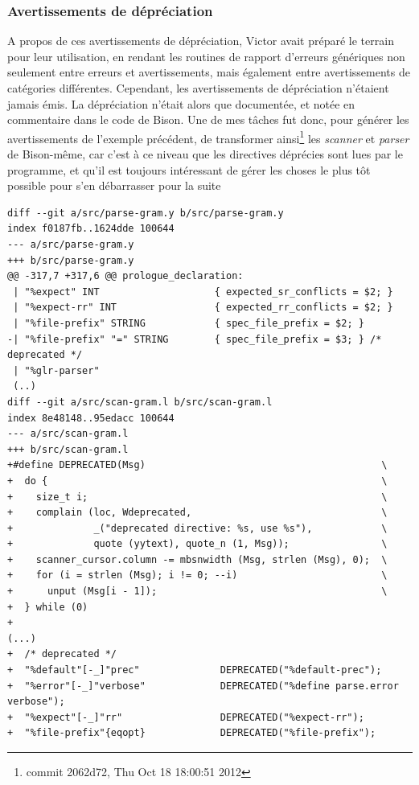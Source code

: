 \documentclass[a4paper,11pt,twoside,final]{article}
\begin{document}
  \subsubsection{Avertissements de dépréciation}

  A propos de ces avertissements de dépréciation, Victor avait préparé le
  terrain pour leur utilisation, en rendant les routines de rapport d'erreurs
  génériques non seulement entre erreurs et avertissements, mais également
  entre avertissements de catégories différentes. Cependant, les avertissements
  de dépréciation n'étaient jamais émis. La dépréciation n'était alors que
  documentée, et notée en commentaire dans le code de Bison. Une de mes tâches
  fut donc, pour générer les avertissements de l'exemple précédent,  de
  transformer ainsi\footnote{commit 2062d72, Thu Oct 18 18:00:51 2012} les
  \textit{scanner} et \textit{parser} de Bison-même, car c'est à ce niveau que
  les directives déprécies sont lues par le programme, et qu'il est toujours
  intéressant de gérer les choses le plus tôt possible pour s'en débarrasser
  pour la suite

  \begin{verbatim}
diff --git a/src/parse-gram.y b/src/parse-gram.y
index f0187fb..1624dde 100644
--- a/src/parse-gram.y
+++ b/src/parse-gram.y
@@ -317,7 +317,6 @@ prologue_declaration:
 | "%expect" INT                    { expected_sr_conflicts = $2; }
 | "%expect-rr" INT                 { expected_rr_conflicts = $2; }
 | "%file-prefix" STRING            { spec_file_prefix = $2; }
-| "%file-prefix" "=" STRING        { spec_file_prefix = $3; } /* deprecated */
 | "%glr-parser"
 (..)
diff --git a/src/scan-gram.l b/src/scan-gram.l
index 8e48148..95edacc 100644
--- a/src/scan-gram.l
+++ b/src/scan-gram.l
+#define DEPRECATED(Msg)                                         \
+  do {                                                          \
+    size_t i;                                                   \
+    complain (loc, Wdeprecated,                                 \
+              _("deprecated directive: %s, use %s"),            \
+              quote (yytext), quote_n (1, Msg));                \
+    scanner_cursor.column -= mbsnwidth (Msg, strlen (Msg), 0);  \
+    for (i = strlen (Msg); i != 0; --i)                         \
+      unput (Msg[i - 1]);                                       \
+  } while (0)
+
(...)
+  /* deprecated */
+  "%default"[-_]"prec"              DEPRECATED("%default-prec");
+  "%error"[-_]"verbose"             DEPRECATED("%define parse.error verbose");
+  "%expect"[-_]"rr"                 DEPRECATED("%expect-rr");
+  "%file-prefix"{eqopt}             DEPRECATED("%file-prefix");
  \end{verbatim}
\end{document}
